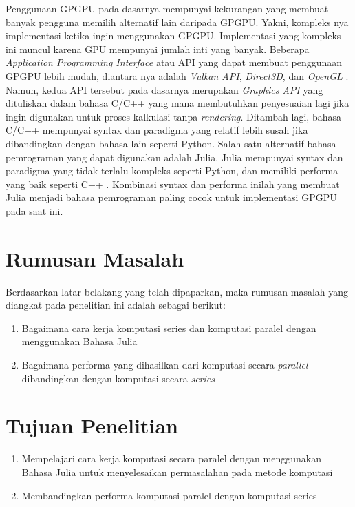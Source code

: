 
Penggunaan GPGPU pada dasarnya mempunyai kekurangan yang membuat banyak
pengguna memilih alternatif lain daripada GPGPU. Yakni, kompleks nya
implementasi ketika ingin menggunakan GPGPU. Implementasi yang kompleks ini
muncul karena GPU mempunyai jumlah inti yang banyak. Beberapa \emph{Application
  Programming Interface} atau API \citep{evansonExplainerWhatAPI2021} yang dapat
membuat penggunaan GPGPU lebih mudah, diantara nya adalah \emph{Vulkan API},
\emph{Direct3D}, dan \emph{OpenGL}
\citep{khairySurveyArchitecturalApproaches2019}. Namun, kedua API tersebut pada
dasarnya merupakan \emph{Graphics API} yang dituliskan dalam bahasa C/C++ yang
mana membutuhkan penyesuaian lagi jika ingin digunakan untuk proses kalkulasi
tanpa \emph{rendering}. Ditambah lagi, bahasa C/C++ mempunyai syntax dan
paradigma yang relatif lebih susah jika dibandingkan dengan bahasa lain seperti
Python. Salah satu alternatif bahasa pemrograman yang dapat digunakan adalah
Julia. Julia mempunyai syntax dan paradigma yang tidak terlalu kompleks seperti
Python, dan memiliki performa yang baik seperti C++
\cite{bezansonJuliaMicroBenchmarks2023}. Kombinasi syntax dan performa inilah
yang membuat Julia menjadi bahasa pemrograman paling cocok untuk implementasi
GPGPU pada saat ini.

\section{Rumusan Masalah}
Berdasarkan latar belakang yang telah dipaparkan, maka rumusan masalah yang
diangkat pada penelitian ini adalah sebagai berikut:
\begin{enumerate}
  \item Bagaimana cara kerja komputasi series dan komputasi paralel dengan menggunakan
        Bahasa Julia

  \item Bagaimana performa yang dihasilkan dari komputasi secara \emph{parallel}
        dibandingkan dengan komputasi secara \emph{series}
\end{enumerate}

\section{Tujuan Penelitian}
\begin{enumerate}
  \item Mempelajari cara kerja komputasi secara paralel dengan menggunakan Bahasa Julia
        untuk menyelesaikan permasalahan pada metode komputasi

  \item Membandingkan performa komputasi paralel dengan komputasi series
\end{enumerate}

